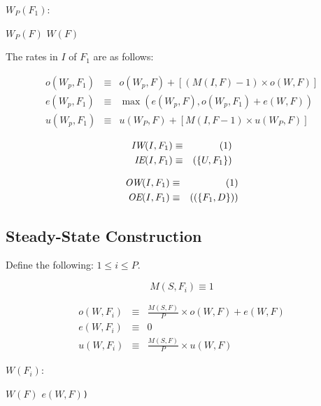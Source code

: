 \begin{algorithm}
$W_P(F_1)$:
\begin{algorithmic}[1]
\State $W_P(F)$
\State $W(F)$
\EndFor
\end{algorithmic}
\end{algorithm}

The rates in $I$ of $F_1$ are as follows:
 
\begin{eqnarray*} 
o(W_p,F_1) & \equiv & o(W_p,F) + [(M(I,F) - 1) \times o(W,F)] \\
e(W_p,F_1) & \equiv & \max(e(W_p,F), o(W_p,F_1) + e(W,F)) \\
u(W_p,F_1) & \equiv & u(W_P,F) + [M(I,F - 1) \times u(W_P,F)]
\end{eqnarray*} 

\begin{eqnarray*}
\mbox{\it IW}(I,F_1) & \equiv & (1) \\
\mbox{\it IE}(I,F_1) & \equiv & (\{U,F_1\}) 
\end{eqnarray*}

\begin{eqnarray*} 
\mbox{\it OW}(I,F_1) & \equiv & (1) \\
\mbox{\it OE}(I,F_1) & \equiv & ((\{F_1, D\})) 
\end{eqnarray*} 

\subsection{Steady-State Construction}
Define the following: $1 \le i \le P$.
 
$$ M(S,F_i) \equiv 1 $$

\begin{eqnarray*} 
o(W,F_i) & \equiv & \frac{M(S,F)}{P} \times o(W,F) + e(W,F)\\
e(W,F_i) & \equiv & 0 \\
u(W,F_i) & \equiv & \frac{M(S,F)}{P} \times u(W,F)
\end{eqnarray*} 

\begin{algorithm}
$W(F_i)$:
\begin{algorithmic}[1]
\State $W(F)$
\EndFor
{}$e(W,F)${\tt)}
\end{algorithmic}
\end{algorithm}


